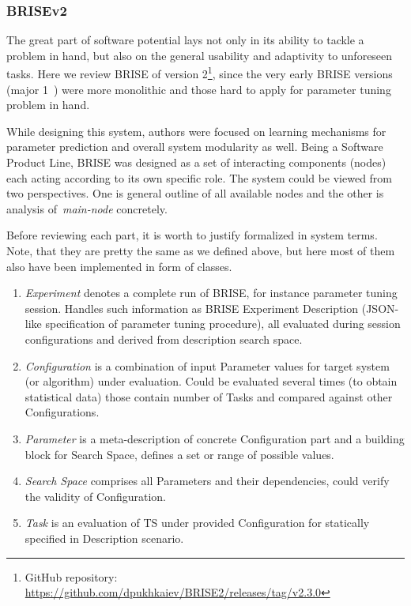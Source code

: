 \subsubsection{BRISEv2~\cite{brise2spl}}
The great part of software potential lays not only in its ability to tackle a problem in hand, but also on the general usability and adaptivity to unforeseen tasks.
Here we review BRISE of version 2\footnote{GitHub repository: \url{https://github.com/dpukhkaiev/BRISE2/releases/tag/v2.3.0}}, since the very early BRISE versions (major 1~\cite{brise1monolite}) were more monolithic and those hard to apply for parameter tuning problem in hand.

While designing this system, authors were focused on learning mechanisms for parameter prediction and overall system modularity as well.
Being a Software Product Line, BRISE was designed as a set of interacting components (nodes) each acting according to its own specific role. 
The system could be viewed from two perspectives. One is general outline of all available nodes and the other is analysis of~\textit{main-node} concretely.

Before reviewing each part, it is worth to justify formalized in system terms. Note, that they are pretty the same as we defined above, but here most of them also have been implemented in form of classes.
\begin{enumerate}
	\item \textit{Experiment} denotes a complete run of BRISE, for instance parameter tuning session. Handles such information as BRISE Experiment Description (JSON-like specification of parameter tuning procedure), all evaluated during session configurations and derived from description search space.

	\item \textit{Configuration} is a combination of input Parameter values for target system (or algorithm) under evaluation. Could be evaluated several times (to obtain statistical data) those contain number of Tasks and compared against other Configurations.

	\item \textit{Parameter} is a meta-description of concrete Configuration part and a building block for Search Space, defines a set or range of possible values. 

	\item \textit{Search Space} comprises all Parameters and their dependencies, could verify the validity of Configuration.

	\item \textit{Task} is an evaluation of TS under provided Configuration for statically specified in Description scenario.
\end{enumerate}

